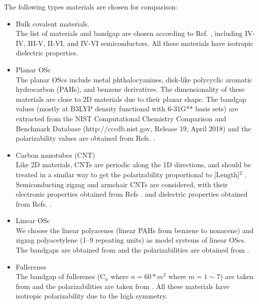 \documentclass[journal=ancac3,email=true,hyperref=true,keywords=false]{achemso}
\begin{document}
The following types materials are chosen for comparison:
\begin{itemize}
\item Bulk covalent materials.  \\
  The list of materials and bandgap are chosen according to
  Ref. , including IV-IV, III-V, II-VI, and
  IV-VI semiconductors. All these materials have isotropic dielectric
  properties.
\item Planar OSc \\
  The planar OScs include metal phthalocyanines, disk-like polycyclic
  aromatic hydrocarbon (PAHs), and benzene derivatives. The
  dimensionality of these materials are close to 2D materials due to
  their planar shape. The bandgap values (mostly at B3LYP density
  functional with 6-31G** basis sets) are extracted from the NIST
  Computational Chemistry Comparison and Benchmark Database
  (http://cccdb.nist.gov, Release 19, April 2018) and the
  polarizability values are obtained from
  Refs. .
\item Carbon nanotubes (CNT) \\
  Like 2D materials, CNTs are periodic along the 1D directions, and
  should be treated in a similar way to get the polarizability
  proportional to [Length]$^{2}$ \cite{Benedict_1995}. Semiconducting
  zigzag and armchair CNTs are considered, with their electronic
  properties obtained from Refs
  . and dielectric properties
  obtained from
  Refs. .
\item Linear OSc \\
  We choose the linear polyacenes (linear PAHs from benzene to
  nonacene) and zigzag polyacetylene (1--9 repeating units) as model
  systems of linear OScs. The bandgaps are obtained from
   and the polarizabilities are obtained from
  .
\item Fullerenes \\
  The bandgap of fullerenes (C$_{n}$ where $n=60*m^{2}$ where
  $m=1\sim{}7$) are taken from  and the
  polarizabilities are taken from . All these
  materials have isotropic polarizability due to the high symmetry.
\end{itemize}
\end{document}
